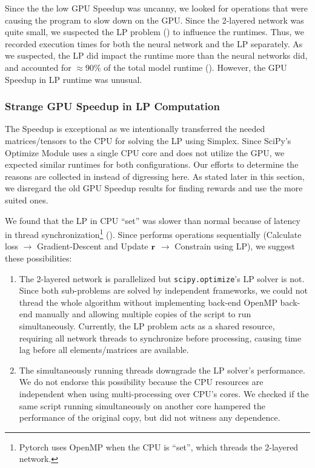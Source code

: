 Since the the low GPU Speedup was uncanny, we looked for operations that were causing the program to slow down on the GPU. Since the 2-layered network was quite small, we suspected the LP problem () to influence the runtimes. Thus, we recorded execution times for both the neural network and the LP separately. As we suspected, the LP did impact the runtime more than the neural networks did, and accounted for $\approx 90 \%$ of the total model runtime (). However, the GPU Speedup in LP runtime was unusual.

\subsubsection{Strange GPU Speedup in LP Computation}
The Speedup is exceptional as we intentionally transferred the needed matrices/tensors to the CPU for solving the LP using Simplex. Since SciPy's Optimize Module uses a single CPU core and does not utilize the GPU, we expected similar runtimes for both configurations. Our efforts to determine the reasons are collected in  instead of digressing here. As stated later in this section, we disregard the old GPU Speedup results for finding rewards and use the more suited ones.

We found that the LP in CPU ``set'' was slower than normal because of latency in thread synchronization\footnote{Pytorch uses OpenMP \cite{PTDocs,OpenMP} when the CPU is ``set'', which threads the 2-layered network.} (). Since  performs operations sequentially (Calculate loss $\rightarrow$ Gradient-Descent and Update $\mathbf{r}$ $\rightarrow$ Constrain using LP), we suggest these possibilities:
\begin{enumerate}
    \item The 2-layered network is parallelized but \texttt{scipy.optimize}'s LP solver is not. Since both sub-problems are solved by independent frameworks, we could not thread the whole algorithm without implementing back-end OpenMP \cite{OpenMP} back-end manually and allowing multiple copies of the script to run simultaneously. Currently, the LP problem acts as a shared resource, requiring all network threads to synchronize before processing, causing time lag before all elements/matrices are available.
    \item The simultaneously running threads downgrade the LP solver's performance. We do not endorse this possibility because the CPU resources are independent when using multi-processing over CPU's cores. We checked if the same script running simultaneously on another core hampered the performance of the original copy, but did not witness any dependence.
\end{enumerate}

